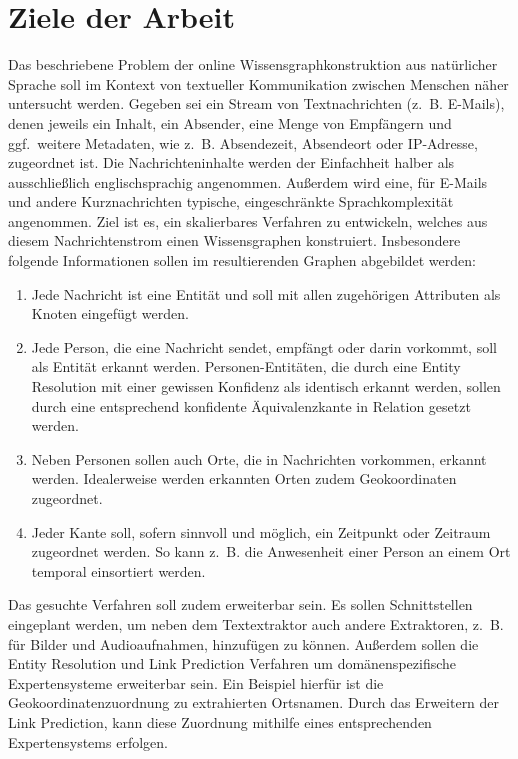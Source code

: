\documentclass[11pt, a4paper]{scrreprt}
\begin{document}
\section{Ziele der Arbeit}

Das beschriebene Problem der online Wissensgraphkonstruktion aus natürlicher Sprache soll im Kontext von textueller Kommunikation zwischen Menschen näher untersucht werden.
Gegeben sei ein Stream von Textnachrichten (z.~B. E-Mails), denen jeweils ein Inhalt, ein Absender, eine Menge von Empfängern und ggf.\ weitere Metadaten, wie z.~B. Absendezeit, Absendeort oder IP-Adresse, zugeordnet ist.
Die Nachrichteninhalte werden der Einfachheit halber als ausschließlich englischsprachig angenommen.
Außerdem wird eine, für E-Mails und andere Kurznachrichten typische, eingeschränkte Sprachkomplexität angenommen.
Ziel ist es, ein skalierbares Verfahren zu entwickeln, welches aus diesem Nachrichtenstrom einen Wissensgraphen konstruiert.
Insbesondere folgende Informationen sollen im resultierenden Graphen abgebildet werden:
\begin{enumerate}
	\item Jede Nachricht ist eine Entität und soll mit allen zugehörigen Attributen als Knoten eingefügt werden.
	\item Jede Person, die eine Nachricht sendet, empfängt oder darin vorkommt, soll als Entität erkannt werden.
		Personen-Entitäten, die durch eine Entity Resolution mit einer gewissen Konfidenz als identisch erkannt werden, sollen durch eine entsprechend konfidente Äquivalenzkante in Relation gesetzt werden.
	\item Neben Personen sollen auch Orte, die in Nachrichten vorkommen, erkannt werden.
		Idealerweise werden erkannten Orten zudem Geokoordinaten zugeordnet.
	\item Jeder Kante soll, sofern sinnvoll und möglich, ein Zeitpunkt oder Zeitraum zugeordnet werden.
		So kann z.~B. die Anwesenheit einer Person an einem Ort temporal einsortiert werden.
\end{enumerate}

Das gesuchte Verfahren soll zudem erweiterbar sein.
Es sollen Schnittstellen eingeplant werden, um neben dem Textextraktor auch andere Extraktoren, z.~B. für Bilder und Audioaufnahmen, hinzufügen zu können.
Außerdem sollen die Entity Resolution und Link Prediction Verfahren um domänenspezifische Expertensysteme erweiterbar sein.
Ein Beispiel hierfür ist die Geokoordinatenzuordnung zu extrahierten Ortsnamen.
Durch das Erweitern der Link Prediction, kann diese Zuordnung mithilfe eines entsprechenden Expertensystems erfolgen.\\
\end{document}
